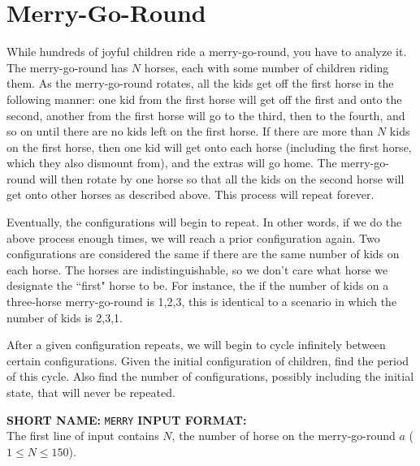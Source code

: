 \documentclass[twoside]{article}
\newcommand{\blank}{\vskip 3mm}
\begin{document}



\section{Merry-Go-Round}

While hundreds of joyful children ride a merry-go-round, you have to analyze it. The merry-go-round has  $N$ horses, each with some number of children riding them. As the merry-go-round rotates, all the kids get off the first horse in the following manner: one kid from the first horse will get off the first and onto the second, another from the first horse will go to the third, then to the fourth, and so on until there are no kids left on the first horse. If there are more than $N$ kids on the first horse, then one kid will get onto each horse (including the first horse, which they also dismount from), and the extras will go home. The merry-go-round will then rotate by one horse so that all the kids on the second horse will get onto other horses as described above. This process will repeat forever.

Eventually, the configurations will begin to repeat. In other words, if we do the above process enough times, we will reach a prior configuration again. Two configurations are considered the same if there are the same number of kids on each horse. The horses are indistinguishable, so we don't care what horse we designate the ``first" horse to be. For instance, the if the number of kids on a three-horse merry-go-round is 1,2,3, this is identical to a scenario in which the number of kids is 2,3,1.

After a given configuration repeats, we will begin to cycle infinitely between certain configurations. Given the initial configuration of children, find the period of this cycle. Also find the number of configurations, possibly including the initial state, that will never be repeated.

\blank
\textbf{SHORT NAME:} \verb|MERRY|
\blank
\textbf{INPUT FORMAT:}\\
The first line of input contains $N$, the number of horse on the merry-go-round $a$ ($1 \leq N \leq 150$).
\end{document}
